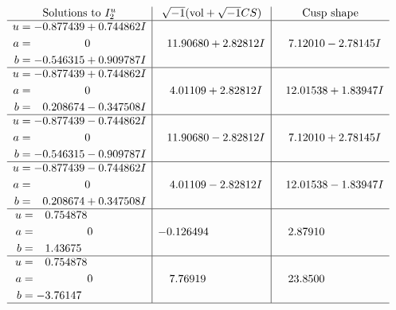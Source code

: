 \documentclass[1p]{elsarticle_modified}
\theoremstyle{definition}
\newcommand{\I}{\sqrt{-1}}
\begin{document}
$$\begin{array}{c|c|c}  
\text{Solutions to }I^u_{2}& \I (\text{vol} + \sqrt{-1}CS) & \text{Cusp shape}\\
 \hline 
\begin{aligned}
u &= -0.877439 + 0.744862 I \\
a &= \phantom{-0.000000 } 0 \\
b &= -0.546315 + 0.909787 I\end{aligned}
 & \phantom{-}11.90680 + 2.82812 I & \phantom{-}7.12010 - 2.78145 I \\ \hline\begin{aligned}
u &= -0.877439 + 0.744862 I \\
a &= \phantom{-0.000000 } 0 \\
b &= \phantom{-}0.208674 - 0.347508 I\end{aligned}
 & \phantom{-}4.01109 + 2.82812 I & \phantom{-}12.01538 + 1.83947 I \\ \hline\begin{aligned}
u &= -0.877439 - 0.744862 I \\
a &= \phantom{-0.000000 } 0 \\
b &= -0.546315 - 0.909787 I\end{aligned}
 & \phantom{-}11.90680 - 2.82812 I & \phantom{-}7.12010 + 2.78145 I \\ \hline\begin{aligned}
u &= -0.877439 - 0.744862 I \\
a &= \phantom{-0.000000 } 0 \\
b &= \phantom{-}0.208674 + 0.347508 I\end{aligned}
 & \phantom{-}4.01109 - 2.82812 I & \phantom{-}12.01538 - 1.83947 I \\ \hline\begin{aligned}
u &= \phantom{-}0.754878\phantom{ +0.000000I} \\
a &= \phantom{-0.000000 } 0 \\
b &= \phantom{-}1.43675\phantom{ +0.000000I}\end{aligned}
 & -0.126494\phantom{ +0.000000I} & \phantom{-}2.87910\phantom{ +0.000000I} \\ \hline\begin{aligned}
u &= \phantom{-}0.754878\phantom{ +0.000000I} \\
a &= \phantom{-0.000000 } 0 \\
b &= -3.76147\phantom{ +0.000000I}\end{aligned}
 & \phantom{-}7.76919\phantom{ +0.000000I} & \phantom{-}23.8500\phantom{ +0.000000I}\\
 \hline 
 \end{array}$$\newpage\newpage\renewcommand{\arraystretch}{1}
\end{document}
